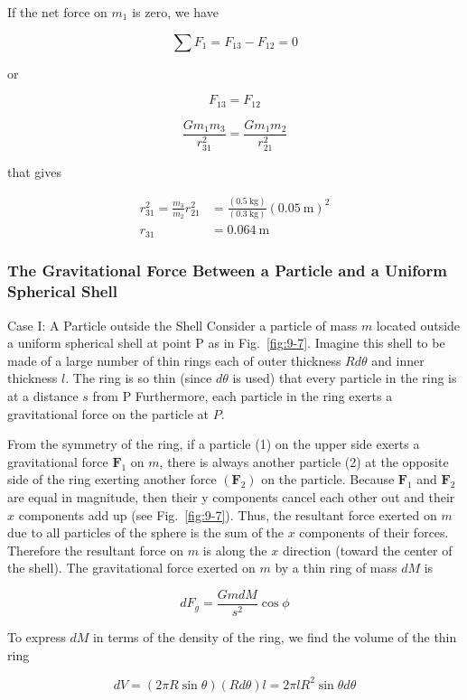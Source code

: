 \documentclass[10pt]{article}
\numberwithin{equation}{section}
\begin{document}
If the net force on $m_{1}$ is zero, we have

$$
\sum F_{1}=F_{13}-F_{12}=0
$$

or

$$
F_{13}=F_{12}
$$

$$
\frac{G m_{1} m_{3}}{r_{31}^{2}}=\frac{G m_{1} m_{2}}{r_{21}^{2}}
$$

that gives

$$
\begin{aligned}
r_{31}^{2}=\frac{m_{3}}{m_{2}} r_{21}^{2} & =\frac{(0.5 \mathrm{~kg})}{(0.3 \mathrm{~kg})}(0.05 \mathrm{~m})^{2} \\
r_{31} & =0.064 \mathrm{~m}
\end{aligned}
$$

\subsubsection{The Gravitational Force Between a Particle and a Uniform Spherical Shell}\label{sec:9-2-1}
Case I: A Particle outside the Shell Consider a particle of mass $m$ located outside a uniform spherical shell at point P as in Fig.~\ref{fig:9-7}. Imagine this shell to be made of a large number of thin rings each of outer thickness $R d \theta$ and inner thickness $l$. The ring is so thin (since $d \theta$ is used) that every particle in the ring is at a distance $s$ from P Furthermore, each particle in the ring exerts a gravitational force on the particle at $P$.

From the symmetry of the ring, if a particle (1) on the upper side exerts a gravitational force $\mathbf{F}_{1}$ on $m$, there is always another particle (2) at the opposite side of the ring exerting another force $\left(\mathbf{F}_{2}\right)$ on the particle. Because $\mathbf{F}_{1}$ and $\mathbf{F}_{2}$ are equal in magnitude, then their y components cancel each other out and their $x$ components add up (see Fig.~\ref{fig:9-7}). Thus, the resultant force exerted on $m$ due to all particles of the sphere is the sum of the $x$ components of their forces. Therefore the resultant force on $m$ is along the $x$ direction (toward the center of the shell). The gravitational force exerted on $m$ by a thin ring of mass $d M$ is

$$
d F_{g}=\frac{G m d M}{s^{2}} \cos \phi
$$

To express $d M$ in terms of the density of the ring, we find the volume of the thin ring

$$
d V=(2 \pi R \sin \theta)(R d \theta) l=2 \pi l R^{2} \sin \theta d \theta
$$
\end{document}
